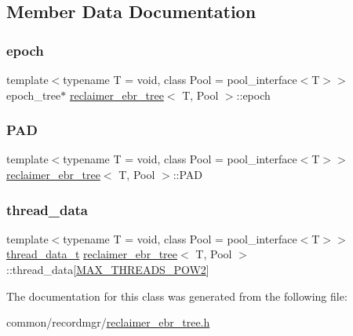 \subsection{Member Data Documentation}
\mbox{\label{classreclaimer__ebr__tree_a83b6dbb2cda5383592a2aed9d5d66402}} 
\subsubsection{\texorpdfstring{epoch}{epoch}}
{\footnotesize\ttfamily template$<$typename T  = void, class Pool  = pool\+\_\+interface$<$\+T$>$$>$ \\
epoch\+\_\+tree$\ast$ \hyperlink{classreclaimer__ebr__tree}{reclaimer\+\_\+ebr\+\_\+tree}$<$ T, Pool $>$\+::epoch\hspace{0.3cm}{\ttfamily [protected]}}

\mbox{\label{classreclaimer__ebr__tree_a574b9ffbb2e9390a01476454383cabef}} 
\subsubsection{\texorpdfstring{P\+AD}{PAD}}
{\footnotesize\ttfamily template$<$typename T  = void, class Pool  = pool\+\_\+interface$<$\+T$>$$>$ \\
\hyperlink{classreclaimer__ebr__tree}{reclaimer\+\_\+ebr\+\_\+tree}$<$ T, Pool $>$\+::P\+AD\hspace{0.3cm}{\ttfamily [protected]}}

\mbox{\label{classreclaimer__ebr__tree_a3ec46853a0bf878335338c3b89debed7}} 
\subsubsection{\texorpdfstring{thread\+\_\+data}{thread\_data}}
{\footnotesize\ttfamily template$<$typename T  = void, class Pool  = pool\+\_\+interface$<$\+T$>$$>$ \\
\hyperlink{structthread__data__t}{thread\+\_\+data\+\_\+t} \hyperlink{classreclaimer__ebr__tree}{reclaimer\+\_\+ebr\+\_\+tree}$<$ T, Pool $>$\+::thread\+\_\+data\mbox{[}\hyperlink{plaf_8h_ac1585a3455dd3e33e877e588be9e466b}{M\+A\+X\+\_\+\+T\+H\+R\+E\+A\+D\+S\+\_\+\+P\+O\+W2}\mbox{]}\hspace{0.3cm}{\ttfamily [protected]}}



The documentation for this class was generated from the following file\+:\begin{DoxyCompactItemize}
\item 
common/recordmgr/\hyperlink{reclaimer__ebr__tree_8h}{reclaimer\+\_\+ebr\+\_\+tree.\+h}\end{DoxyCompactItemize}
